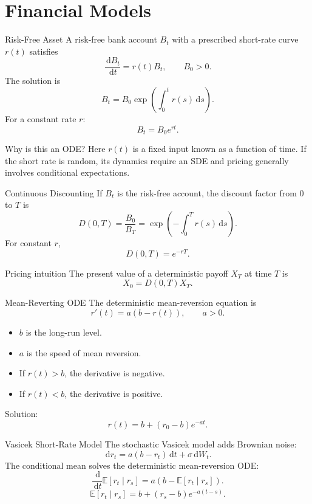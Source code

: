 \documentclass[aspectratio=169]{beamer}
\newcommand{\E}{\mathbb{E}}
\newcommand{\dd}{\,\mathrm{d}}
\begin{document}
\section{Financial Models}

\begin{frame}{Risk-Free Asset}
A risk-free bank account $B_t$ with a prescribed short-rate curve $r(t)$ satisfies
\[
\frac{\dd B_t}{\dd t}=r(t)B_t,\qquad B_0>0.
\]
\pause
The solution is
\[
B_t=B_0\exp\left(\int_0^t r(s)\dd s\right).
\]
\pause
For a constant rate $r$:
\[
B_t=B_0e^{rt}.
\]
\begin{block}{Why is this an ODE?}
Here $r(t)$ is a fixed input known as a function of time. If the short rate is
random, its dynamics require an SDE and pricing generally involves conditional
expectations.
\end{block}
\end{frame}

\begin{frame}{Continuous Discounting}
If $B_t$ is the risk-free account, the discount factor from $0$ to $T$ is
\[
D(0,T)=\frac{B_0}{B_T}
=\exp\left(-\int_0^T r(s)\dd s\right).
\]
\pause
For constant $r$,
\[
D(0,T)=e^{-rT}.
\]
\pause
\begin{block}{Pricing intuition}
The present value of a deterministic payoff $X_T$ at time $T$ is
\[
X_0=D(0,T)X_T.
\]
\end{block}
\end{frame}

\begin{frame}{Mean-Reverting ODE}
The deterministic mean-reversion equation is
\[
r'(t)=a(b-r(t)),\qquad a>0.
\]
\pause
\begin{itemize}
  \item $b$ is the long-run level.
  \item $a$ is the speed of mean reversion.
  \item If $r(t)>b$, the derivative is negative.
  \item If $r(t)<b$, the derivative is positive.
\end{itemize}
\pause
Solution:
\[
r(t)=b+(r_0-b)e^{-at}.
\]
\end{frame}

\begin{frame}{Vasicek Short-Rate Model}
The stochastic Vasicek model adds Brownian noise:
\[
\dd r_t=a(b-r_t)\dd t+\sigma\dd W_t.
\]
\pause
The conditional mean solves the deterministic mean-reversion ODE:
\[
\frac{\dd}{\dd t}\E[r_t\mid r_s]
=a\left(b-\E[r_t\mid r_s]\right).
\]
\pause
\[
\E[r_t\mid r_s]=b+(r_s-b)e^{-a(t-s)}.
\]
\end{frame}
\end{document}
